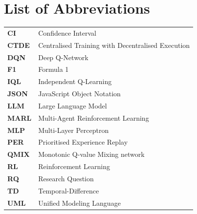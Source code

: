 \chapter*{List of Abbreviations}
\thispagestyle{empty}
\begin{tabular}{@{}lp{}@{}}
\textbf{CI}    & Confidence Interval \\
\textbf{CTDE}  & Centralised Training with Decentralised Execution \\
\textbf{DQN}   & Deep Q-Network \\
\textbf{F1}    & Formula 1 \\
\textbf{IQL}   & Independent Q-Learning \\
\textbf{JSON}  & JavaScript Object Notation \\
\textbf{LLM}   & Large Language Model \\
\textbf{MARL}  & Multi-Agent Reinforcement Learning \\
\textbf{MLP}   & Multi-Layer Perceptron \\
\textbf{PER}   & Prioritised Experience Replay \\
\textbf{QMIX}  & Monotonic Q-value Mixing network \\
\textbf{RL}    & Reinforcement Learning \\
\textbf{RQ}    & Research Question \\
\textbf{TD}    & Temporal-Difference \\
\textbf{UML}   & Unified Modeling Language \\
\end{tabular}